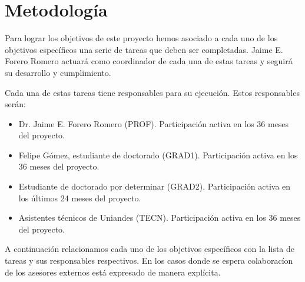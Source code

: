 
\section{Metodolog\'ia}

Para lograr los objetivos de este proyecto hemos asociado a cada uno
de los objetivos espec\'ificos una serie de tareas que deben ser
completadas. Jaime E. Forero Romero actuar\'a como coordinador de cada
una de estas tareas y seguir\'a su desarrollo y cumplimiento. 

Cada una de estas tareas tiene responsables para su ejecuci\'on. Estos
responsables ser\'an:

\begin{itemize}
\item Dr. Jaime E. Forero Romero  (PROF). Participaci\'on activa en
  los 36 meses del proyecto. 
\item Felipe G\'omez, estudiante de doctorado (GRAD1). Participaci\'on
  activa en los 36 meses del proyecto.
\item Estudiante de doctorado por determinar (GRAD2). Participaci\'on
  activa en los \'ultimos 24 meses del proyecto.
\item Asistentes t\'ecnicos de Uniandes (TECN). Participaci\'on activa
  en los 36 meses del proyecto.
\end{itemize}


A continuaci\'on relacionamos cada uno de los objetivos espec\'ificos
con la lista de tareas y sus responsables respectivos. En los casos
donde se espera colaborac\'ion de los asesores externos est\'a
expresado de manera expl\'icita.


